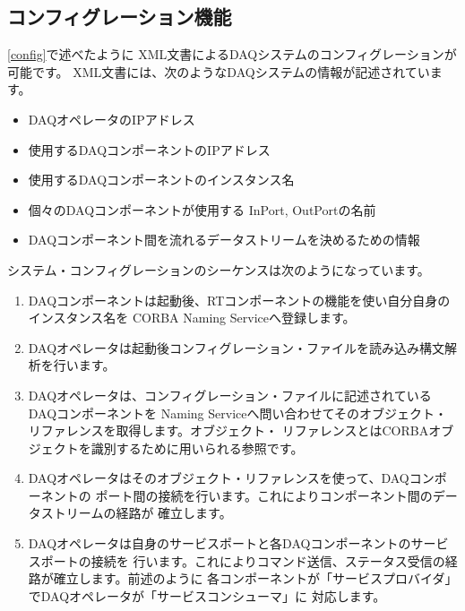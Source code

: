 \documentclass[a4j,10pt,dvips,onecolumn,oneside,final]{jarticle}%
\begin{document}
\subsection{コンフィグレーション機能}\label{operator-config}
\ref{config}で述べたように XML文書によるDAQシステムのコンフィグレーションが可能です。
XML文書には、次のようなDAQシステムの情報が記述されています。
\begin{itemize}
\item DAQオペレータのIPアドレス
\item 使用するDAQコンポーネントのIPアドレス
\item 使用するDAQコンポーネントのインスタンス名
\item 個々のDAQコンポーネントが使用する InPort, OutPortの名前
\item DAQコンポーネント間を流れるデータストリームを決めるための情報
\end{itemize}

システム・コンフィグレーションのシーケンスは次のようになっています。
\begin{enumerate}
\item DAQコンポーネントは起動後、RTコンポーネントの機能を使い自分自身のインスタンス名を 
  CORBA Naming Serviceへ登録します。
\item DAQオペレータは起動後コンフィグレーション・ファイルを読み込み構文解析を行います。
\item DAQオペレータは、コンフィグレーション・ファイルに記述されているDAQコンポーネントを
Naming Serviceへ問い合わせてそのオブジェクト・リファレンスを取得します。オブジェクト・
リファレンスとはCORBAオブジェクトを識別するために用いられる参照です。
\item DAQオペレータはそのオブジェクト・リファレンスを使って、DAQコンポーネントの
  ポート間の接続を行います。これによりコンポーネント間のデータストリームの経路が
  確立します。
\item DAQオペレータは自身のサービスポートと各DAQコンポーネントのサービスポートの接続を
  行います。これによりコマンド送信、ステータス受信の経路が確立します。前述のように
  各コンポーネントが「サービスプロバイダ」でDAQオペレータが「サービスコンシューマ」に
  対応します。
\end{enumerate}
\end{document}
